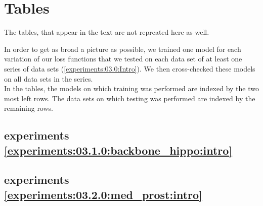 \chapter{Tables}
\label{Tables}
The tables, that appear in the text are not repreated here as well.


In order to get as broad a picture as possible, we trained one model for each variation of our loss functions that we tested on each data set of at least one series of data sets (\autoref{experiments:03.0:Intro}). We then cross-checked these models on all data sets in the series.\\
In the tables, the models on which training was performed are indexed by the two most left rows. The data sets on which testing was performed are indexed by the remaining rows.


\section{experiments \autoref{experiments:03.1.0:backbone_hippo:intro}}






\newpage
\section{experiments \autoref{experiments:03.2.0:med_prost:intro}}
 
\newpage
